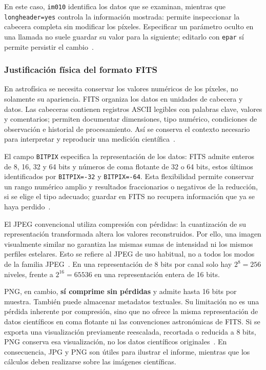 \documentclass[11pt,a4paper]{article}
\begin{document}
En este caso, \texttt{im010} identifica los datos que se examinan,
mientras que \texttt{longheader=yes} controla la información mostrada:
permite inspeccionar la cabecera completa sin modificar los píxeles.
Especificar un parámetro oculto en una llamada no suele guardar su valor
para la siguiente; editarlo con \texttt{epar} sí permite persistir el
cambio~\cite{iraf}.

\subsubsection*{Justificación física del formato FITS}
En astrofísica se necesita conservar los valores numéricos de los píxeles,
no solamente su apariencia. FITS organiza los datos en unidades de
cabecera y datos. Las cabeceras contienen registros ASCII legibles con
palabras clave, valores y comentarios; permiten documentar dimensiones,
tipo numérico, condiciones de observación e historial de procesamiento.
Así se conserva el contexto necesario para interpretar y reproducir una
medición científica~\cite{fitsprimer}.

El campo \texttt{BITPIX} especifica la representación de los datos:
FITS admite enteros de 8, 16, 32 y 64 bits y números de coma flotante
de 32 o 64 bits, estos últimos identificados por \texttt{BITPIX=-32}
y \texttt{BITPIX=-64}. Esta flexibilidad permite conservar un rango
numérico amplio y resultados fraccionarios o negativos de la reducción,
si se elige el tipo adecuado; guardar en FITS no recupera información
que ya se haya perdido~\cite{fitsstandard}.

El JPEG convencional utiliza compresión con pérdidas: la cuantización
de su representación transformada altera los valores reconstruidos.
Por ello, una imagen visualmente similar no garantiza las mismas sumas
de intensidad ni los mismos perfiles estelares. Esto se refiere al JPEG
de uso habitual, no a todos los modos de la familia JPEG~\cite{jpeg}.
En una representación de 8 bits por canal solo hay $2^8=256$ niveles,
frente a $2^{16}=65536$ en una representación entera de 16 bits.

PNG, en cambio, \textbf{sí comprime sin pérdidas} y admite hasta 16 bits
por muestra. También puede almacenar metadatos textuales. Su limitación
no es una pérdida inherente por compresión, sino que no ofrece la misma
representación de datos científicos en coma flotante ni las convenciones
astronómicas de FITS. Si se exporta una visualización previamente
reescalada, recortada o reducida a 8 bits, PNG conserva esa visualización,
no los datos científicos originales~\cite{png,fitsstandard}.
En consecuencia, JPG y PNG son útiles para ilustrar el informe, mientras
que los cálculos deben realizarse sobre las imágenes científicas.
\end{document}
